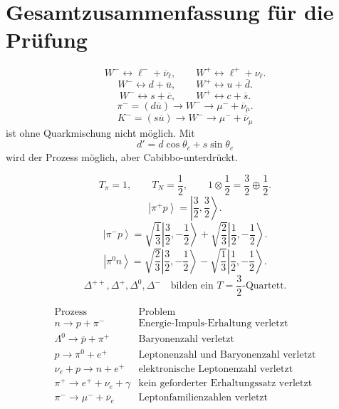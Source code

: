 \documentclass[11pt,a4paper]{scrartcl}
\newcommand{\ket}[1]{\left| #1 \right\rangle}
\theoremstyle{definition}
\theoremstyle{plain}
\theoremstyle{remark}
\begin{document}
\FloatBarrier
\newpage

\section{Gesamtzusammenfassung f\"ur die Pr\"ufung}

\begin{summarybox}[title=Aufgabe 1: Schwache Vertizes]
\[
    W^- \leftrightarrow \ell^-+\overline\nu_\ell,
    \qquad
    W^+ \leftrightarrow \ell^+ + \nu_\ell.
\]
\[
    W^- \leftrightarrow d+\overline u,
    \qquad
    W^+ \leftrightarrow u+\overline d.
\]
\[
    W^- \leftrightarrow s+\overline c,
    \qquad
    W^+ \leftrightarrow c+\overline s.
\]
\[
    \pi^-=(d\overline u)\to W^-\to\mu^-+\overline\nu_\mu.
\]
\[
    K^-=(s\overline u)\to W^-\to\mu^-+\overline\nu_\mu
\]
ist ohne Quarkmischung nicht möglich. Mit
\[
    d'=d\cos\theta_c+s\sin\theta_c
\]
wird der Prozess möglich, aber Cabibbo-unterdrückt.
\end{summarybox}

\begin{summarybox}[title=Aufgabe 2: Isospin]
\[
    T_\pi=1,
    \qquad
    T_N=\frac12,
    \qquad
    1\otimes\frac12=\frac32\oplus\frac12.
\]
\[
    \ket{\pi^+p}=\ket{\frac32,\frac32}.
\]
\[
    \ket{\pi^-p}
    =
    \sqrt{\frac13}\ket{\frac32,-\frac12}
    +
    \sqrt{\frac23}\ket{\frac12,-\frac12}.
\]
\[
    \ket{\pi^0n}
    =
    \sqrt{\frac23}\ket{\frac32,-\frac12}
    -
    \sqrt{\frac13}\ket{\frac12,-\frac12}.
\]
\[
    \Delta^{++},\Delta^+,\Delta^0,\Delta^-
    \quad\text{bilden ein }T=\frac32\text{-Quartett.}
\]
\end{summarybox}

\begin{summarybox}[title=Aufgabe 3: Erhaltungss\"atze]
\[
\begin{array}{c|l}
\text{Prozess} & \text{Problem}\\
\hline
n\to p+\pi^- & \text{Energie-Impuls-Erhaltung verletzt}\\
\Lambda^0\to\overline p+\pi^+ & \text{Baryonenzahl verletzt}\\
p\to\pi^0+e^+ & \text{Leptonenzahl und Baryonenzahl verletzt}\\
\nu_e+p\to n+e^+ & \text{elektronische Leptonenzahl verletzt}\\
\pi^+\to e^+ + \nu_e+\gamma & \text{kein geforderter Erhaltungssatz verletzt}\\
\pi^-\to\mu^-+\overline\nu_e & \text{Leptonfamilienzahlen verletzt}
\end{array}
\]
\end{summarybox}
\end{document}
